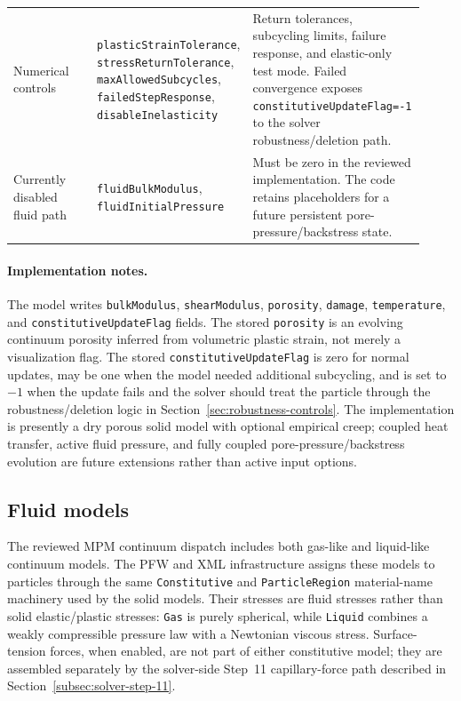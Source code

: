 \begin{longtable}{@{}p{0.22\linewidth}p{0.28\linewidth}p{0.42\linewidth}@{}}
Numerical controls & \texttt{plasticStrainTolerance}, \texttt{stressReturnTolerance}, \texttt{maxAllowedSubcycles}, \texttt{failedStepResponse}, \texttt{disableInelasticity} & Return tolerances, subcycling limits, failure response, and elastic-only test mode.  Failed convergence exposes \texttt{constitutiveUpdateFlag=-1} to the solver robustness/deletion path.\\
Currently disabled fluid path & \texttt{fluidBulkModulus}, \texttt{fluidInitialPressure} & Must be zero in the reviewed implementation.  The code retains placeholders for a future persistent pore-pressure/backstress state.\\
\bottomrule
\end{longtable}

\paragraph{Implementation notes.}
The model writes \texttt{bulkModulus}, \texttt{shearModulus}, \texttt{porosity}, \texttt{damage}, \texttt{temperature}, and \texttt{constitutiveUpdateFlag} fields.  The stored \texttt{porosity} is an evolving continuum porosity inferred from volumetric plastic strain, not merely a visualization flag.  The stored \texttt{constitutiveUpdateFlag} is zero for normal updates, may be one when the model needed additional subcycling, and is set to \(-1\) when the update fails and the solver should treat the particle through the robustness/deletion logic in Section~\ref{sec:robustness-controls}.  The implementation is presently a dry porous solid model with optional empirical creep; coupled heat transfer, active fluid pressure, and fully coupled pore-pressure/backstress evolution are future extensions rather than active input options.


\subsection{Fluid models}
\label{subsec:fluid-constitutive-models}

The reviewed MPM continuum dispatch includes both gas-like and liquid-like continuum models.  The PFW and XML infrastructure assigns these models to particles through the same \texttt{Constitutive} and \texttt{ParticleRegion} material-name machinery used by the solid models.  Their stresses are fluid stresses rather than solid elastic/plastic stresses: \texttt{Gas} is purely spherical, while \texttt{Liquid} combines a weakly compressible pressure law with a Newtonian viscous stress.  Surface-tension forces, when enabled, are not part of either constitutive model; they are assembled separately by the solver-side Step~11 capillary-force path described in Section~\ref{subsec:solver-step-11}.

